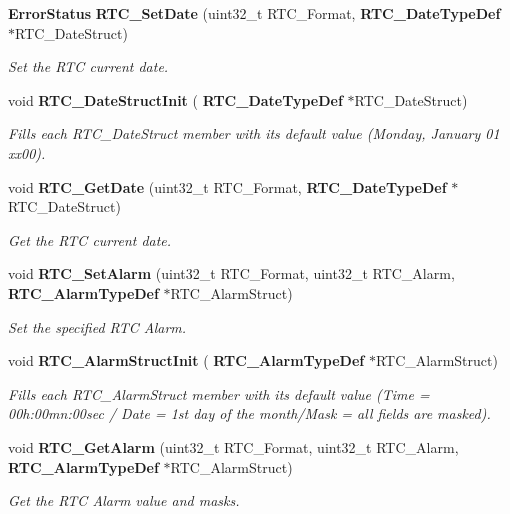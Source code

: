 \begin{DoxyCompactItemize}
\textbf{ Error\+Status} \textbf{ R\+T\+C\+\_\+\+Set\+Date} (uint32\+\_\+t R\+T\+C\+\_\+\+Format, \textbf{ R\+T\+C\+\_\+\+Date\+Type\+Def} $\ast$R\+T\+C\+\_\+\+Date\+Struct)
\begin{DoxyCompactList}\small\item\em Set the R\+TC current date. \end{DoxyCompactList}\item 
void \textbf{ R\+T\+C\+\_\+\+Date\+Struct\+Init} (\textbf{ R\+T\+C\+\_\+\+Date\+Type\+Def} $\ast$R\+T\+C\+\_\+\+Date\+Struct)
\begin{DoxyCompactList}\small\item\em Fills each R\+T\+C\+\_\+\+Date\+Struct member with its default value (Monday, January 01 xx00). \end{DoxyCompactList}\item 
void \textbf{ R\+T\+C\+\_\+\+Get\+Date} (uint32\+\_\+t R\+T\+C\+\_\+\+Format, \textbf{ R\+T\+C\+\_\+\+Date\+Type\+Def} $\ast$R\+T\+C\+\_\+\+Date\+Struct)
\begin{DoxyCompactList}\small\item\em Get the R\+TC current date. \end{DoxyCompactList}\item 
void \textbf{ R\+T\+C\+\_\+\+Set\+Alarm} (uint32\+\_\+t R\+T\+C\+\_\+\+Format, uint32\+\_\+t R\+T\+C\+\_\+\+Alarm, \textbf{ R\+T\+C\+\_\+\+Alarm\+Type\+Def} $\ast$R\+T\+C\+\_\+\+Alarm\+Struct)
\begin{DoxyCompactList}\small\item\em Set the specified R\+TC Alarm. \end{DoxyCompactList}\item 
void \textbf{ R\+T\+C\+\_\+\+Alarm\+Struct\+Init} (\textbf{ R\+T\+C\+\_\+\+Alarm\+Type\+Def} $\ast$R\+T\+C\+\_\+\+Alarm\+Struct)
\begin{DoxyCompactList}\small\item\em Fills each R\+T\+C\+\_\+\+Alarm\+Struct member with its default value (Time = 00h\+:00mn\+:00sec / Date = 1st day of the month/\+Mask = all fields are masked). \end{DoxyCompactList}\item 
void \textbf{ R\+T\+C\+\_\+\+Get\+Alarm} (uint32\+\_\+t R\+T\+C\+\_\+\+Format, uint32\+\_\+t R\+T\+C\+\_\+\+Alarm, \textbf{ R\+T\+C\+\_\+\+Alarm\+Type\+Def} $\ast$R\+T\+C\+\_\+\+Alarm\+Struct)
\begin{DoxyCompactList}\small\item\em Get the R\+TC Alarm value and masks. \end{DoxyCompactList}\item 

\end{DoxyCompactItemize}
